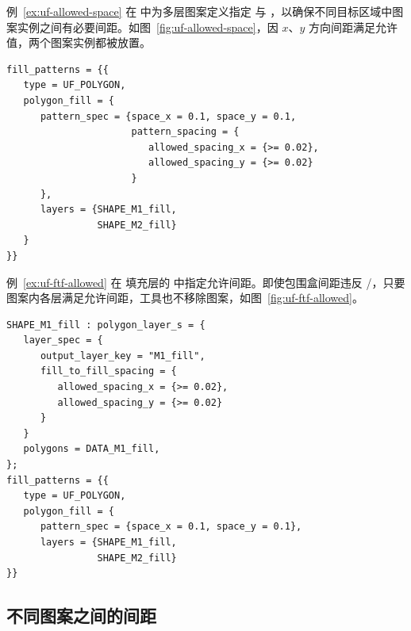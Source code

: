 
例~\ref{ex:uf-allowed-space} 在  中为多层图案定义指定  与 ，以确保不同目标区域中图案实例之间有必要间距。如图~\ref{fig:uf-allowed-space}，因 $x$、$y$ 方向间距满足允许值，两个图案实例都被放置。

\begin{lstlisting}[style=pxl,caption={允许间距小于 space 值时的多层图案间距},label={ex:uf-allowed-space}]
fill_patterns = {{
   type = UF_POLYGON,
   polygon_fill = {
      pattern_spec = {space_x = 0.1, space_y = 0.1,
                      pattern_spacing = {
                         allowed_spacing_x = {>= 0.02},
                         allowed_spacing_y = {>= 0.02}
                      }
      },
      layers = {SHAPE_M1_fill,
                SHAPE_M2_fill}
   }
}}
\end{lstlisting}


例~\ref{ex:uf-ftf-allowed} 在  填充层的  中指定允许间距。即使包围盒间距违反 /，只要图案内各层满足允许间距，工具也不移除图案，如图~\ref{fig:uf-ftf-allowed}。

\begin{lstlisting}[style=pxl,caption={在 fill\_to\_fill\_spacing 中使用允许间距},label={ex:uf-ftf-allowed}]
SHAPE_M1_fill : polygon_layer_s = {
   layer_spec = {
      output_layer_key = "M1_fill",
      fill_to_fill_spacing = {
         allowed_spacing_x = {>= 0.02},
         allowed_spacing_y = {>= 0.02}
      }
   }
   polygons = DATA_M1_fill,
};
fill_patterns = {{
   type = UF_POLYGON,
   polygon_fill = {
      pattern_spec = {space_x = 0.1, space_y = 0.1},
      layers = {SHAPE_M1_fill,
                SHAPE_M2_fill}
}}
\end{lstlisting}


\subsection{不同图案之间的间距}
